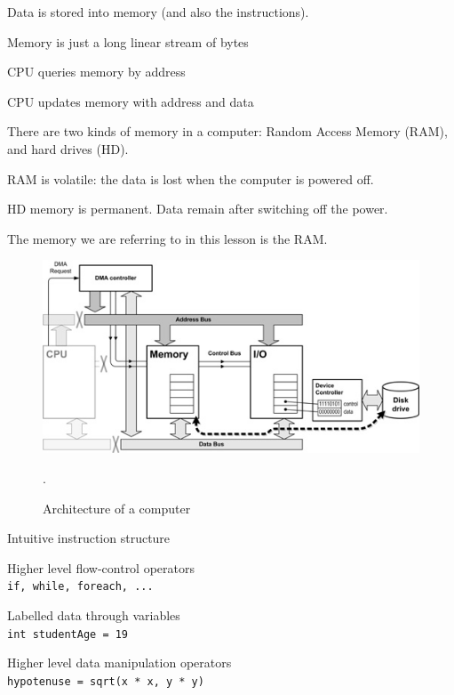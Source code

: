 \documentclass{beamer}
\begin{document}
\begin{slide}{
\item Data is stored into memory (and also the instructions).
\item Memory is just a long linear stream of bytes
\item CPU queries memory by address
\item CPU updates memory with address and data
}\end{slide}

\begin{slide}{
\item There are two kinds of memory in a computer: Random Access Memory (RAM), and hard drives (HD).
\item RAM is volatile: the data is lost when the computer is powered off.
\item HD memory is permanent. Data remain after switching off the power.
\item The memory we are referring to in this lesson is the RAM.
}\end{slide}

\begin{slide}{\item[] \begin{figure}
\includegraphics[scale=3.0]{images/computer_architecture}
\caption{Architecture of a computer}.
\end{figure}}
\end{slide}

\begin{slide}{
\item Intuitive instruction structure
\item Higher level flow-control operators \\ \texttt{if, while, foreach, ...}
\item Labelled data through variables \\ \texttt{int studentAge = 19}
\item Higher level data manipulation operators \\ \texttt{hypotenuse = sqrt(x * x, y * y)}
}\end{slide}
\end{document}
